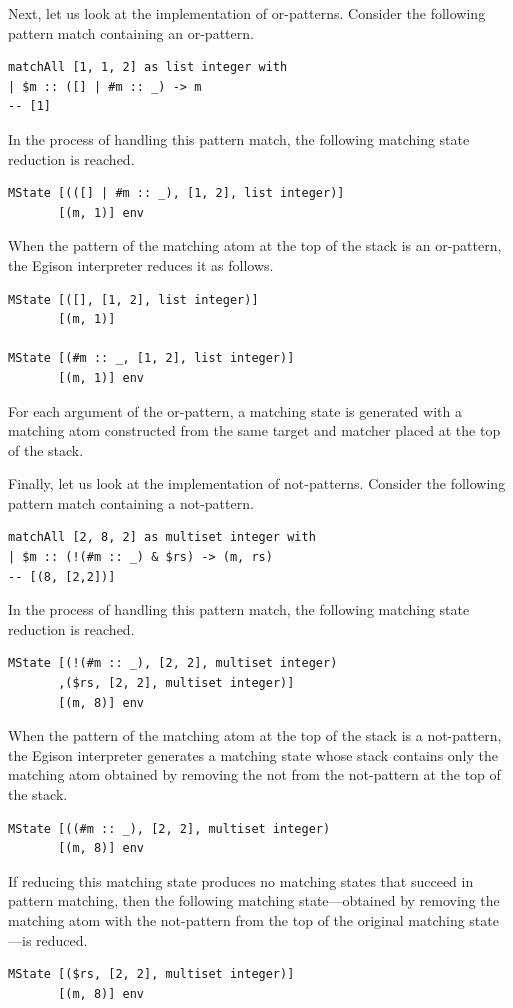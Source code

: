 Next, let us look at the implementation of or-patterns.
Consider the following pattern match containing an or-pattern.
\begin{lstlisting}[language=egison,numbers=none]
matchAll [1, 1, 2] as list integer with
| $m :: ([] | #m :: _) -> m
-- [1]
\end{lstlisting}
In the process of handling this pattern match, the following matching state reduction is reached.
\begin{lstlisting}[language=egison,numbers=none]
MState [(([] | #m :: _), [1, 2], list integer)]
       [(m, 1)] env
\end{lstlisting}
When the pattern of the matching atom at the top of the stack is an or-pattern, the Egison interpreter reduces it as follows.
\begin{lstlisting}[language=egison,numbers=none]
MState [([], [1, 2], list integer)]
       [(m, 1)]

MState [(#m :: _, [1, 2], list integer)]
       [(m, 1)] env
\end{lstlisting}
For each argument of the or-pattern, a matching state is generated with a matching atom constructed from the same target and matcher placed at the top of the stack.

Finally, let us look at the implementation of not-patterns.
Consider the following pattern match containing a not-pattern.
\begin{lstlisting}[language=egison,numbers=none]
matchAll [2, 8, 2] as multiset integer with
| $m :: (!(#m :: _) & $rs) -> (m, rs)
-- [(8, [2,2])]
\end{lstlisting}
In the process of handling this pattern match, the following matching state reduction is reached.
\begin{lstlisting}[language=egison,numbers=none]
MState [(!(#m :: _), [2, 2], multiset integer)
       ,($rs, [2, 2], multiset integer)]
       [(m, 8)] env
\end{lstlisting}
When the pattern of the matching atom at the top of the stack is a not-pattern, the Egison interpreter generates a matching state whose stack contains only the matching atom obtained by removing the not from the not-pattern at the top of the stack.
\begin{lstlisting}[language=egison,numbers=none]
MState [((#m :: _), [2, 2], multiset integer)
       [(m, 8)] env
\end{lstlisting}
If reducing this matching state produces no matching states that succeed in pattern matching, then the following matching state---obtained by removing the matching atom with the not-pattern from the top of the original matching state---is reduced.
\begin{lstlisting}[language=egison,numbers=none]
MState [($rs, [2, 2], multiset integer)]
       [(m, 8)] env
\end{lstlisting}



